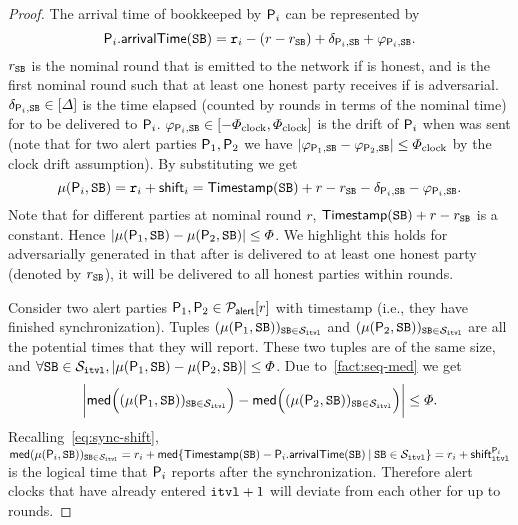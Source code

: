 \begin{proof}
    The arrival time of \beacon bookkeeped by $\mathsf{P}_i$ can be represented by
    \[ \mathsf{P}_i.\mathsf{arrivalTime}(\mathtt{SB}) = \mathtt{r}_i - (r - r_\mathtt{SB}) + \delta_{\mathsf{P}_i, \mathtt{SB}} + \varphi_{\mathsf{P}_i, \mathtt{SB}}. \]
    $r_\mathtt{SB}$ is the nominal round that \beacon is emitted to the network if \beacon is honest, and is the first nominal round such that at least one honest party receives \beacon if \beacon is adversarial.
    $\delta_{\mathsf{P}_i, \mathtt{SB}} \in [\varDelta]$ is the time elapsed (counted by rounds in terms of the nominal time) for \beacon to be delivered to $\mathsf{P}_i$.
    $\varphi_{\mathsf{P}_i, \mathtt{SB}} \in [-\varPhi_{\mathrm{clock}}, \varPhi_{\mathrm{clock}}]$ is the drift of $\mathsf{P}_i$ when \beacon was sent (note that for two alert parties $\mathsf{P}_1, \mathsf{P}_2$ we have $|\varphi_{\mathsf{P}_1, \mathtt{SB}} - \varphi_{\mathsf{P}_2, \mathtt{SB}} | \le \varPhi_{\mathrm{clock}}$ by the clock drift assumption).
    By substituting we get
    \begin{equation} \label{eq:shift-compute}
        \mu(\mathsf{P}_i, \mathtt{SB}) = \mathtt{r}_i + \mathsf{shift}_i = \mathsf{Timestamp}(\mathtt{SB}) + r - r_\mathtt{SB} - \delta_{\mathsf{P}_i, \mathtt{SB}} - \varphi_{\mathsf{P}_i, \mathtt{SB}}.
    \end{equation}
    Note that for different parties at nominal round $r$, $\mathsf{Timestamp}(\mathtt{SB}) + r - r_\mathtt{SB}$ is a constant.
    Hence $|\mu(\mathsf{P}_1, \mathtt{SB}) - \mu(\mathsf{P}_2, \mathtt{SB})| \le \varPhi$.
    We highlight this holds for adversarially generated \beacon in that after \beacon is delivered to at least one honest party (denoted by $r_\mathtt{SB}$), it will be delivered to all honest parties within \delay rounds.

    Consider two alert parties $\mathsf{P}_1, \mathsf{P}_2 \in \mathcal{P}_{\mathsf{alert}}[r]$ with timestamp  (i.e., they have finished synchronization).
    Tuples $(\mu(\mathsf{P}_1, \mathtt{SB}))_{\mathtt{SB} \in \mathcal{S}_{\mathtt{itvl}}}$ and $(\mu(\mathsf{P}_2, \mathtt{SB}))_{\mathtt{SB} \in \mathcal{S}_{\mathtt{itvl}}}$ are all the potential times that they will report.
    These two tuples are of the same size, and $\forall \mathtt{SB} \in \mathcal{S}_{\mathtt{itvl}}, |\mu(\mathsf{P}_1, \mathtt{SB}) - \mu(\mathsf{P}_2, \mathtt{SB})| \le \varPhi$.
    Due to~\cref{fact:seq-med} we get
    \[ \bigg| \mathsf{med} \Big( (\mu(\mathsf{P}_1, \mathtt{SB}))_{\mathtt{SB} \in \mathcal{S}_\mathtt{itvl}} \Big) - \mathsf{med} \Big( (\mu(\mathsf{P}_2, \mathtt{SB}))_{\mathtt{SB} \in\mathcal{S}_\mathtt{itvl}} \Big) \bigg| \le \varPhi. \]
    Recalling~\cref{eq:sync-shift}, $\mathsf{med}(\mu(\mathsf{P}_i, \mathtt{SB}))_{\mathtt{SB} \in \mathcal{S}_\mathtt{itvl}} = r_i + \mathsf{med} \{ \mathsf{Timestamp}(\mathtt{SB}) - \mathsf{P}_i.\mathsf{arrivalTime}(\mathtt{SB}) \mathbin| \mathtt{SB} \in \mathcal{S}_\mathtt{itvl} \} = r_i + \mathsf{shift}_\mathtt{itvl}^{\mathsf{P}_i}$ is the logical time that $\mathsf{P}_i$ reports after the synchronization. Therefore alert clocks that have already entered $\mathtt{itvl} + 1$ will deviate from each other for up to \maxskew rounds.


\end{proof}
